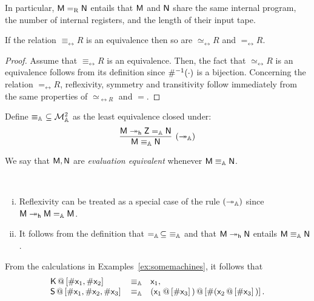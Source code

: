 In particular, $\mathsf M =_{\text{\sc R}} \mathsf N$ entails that $\mathsf M$ and $\mathsf N$ share the same internal program, the number of internal registers, and the length of their input tape.

\begin{lem}\label{lem:equivalence}
If the relation $\equiv_\rel{R}$ is an equivalence then so are $\simeq_\rel{R}$ and $=_\rel{R}$.
\end{lem}
\begin{proof} Assume that $\equiv_\rel{R}$ is an equivalence. Then, the fact that $\simeq_\rel{R}$ is an equivalence follows from its definition since $\#^{-1}(\cdot)$ is a bijection. Concerning the relation $=_\rel{R}$, reflexivity, symmetry and transitivity follow immediately from the same properties of $\simeq_{\rel{R}}$ and $=$.
\end{proof}

\begin{defi}\label{def:equiv:Addrs}
Define $\equiv_{\mathbb{A}}\ \subseteq\mathcal{M}_{\mathbb{A}}^2$ as the least equivalence closed under:
\[
	\infer[\redrule]{\mM\equiv_\Addrs	 \mN}{\mM\reddh \mZ =_\Addrs \mN}
\]
\end{defi}
We say that $\mathsf M,\mathsf N$ are \emph{evaluation equivalent} whenever $\mathsf M\equiv_{\mathbb{A}}\mathsf N$.

\begin{rem}\
\begin{enumerate}[(i)]
\item Reflexivity can be treated as a special case of the rule $(\twoheadrightarrow_{\mathbb{A}})$ since $\mathsf M\twoheadrightarrow_{\mathsf{h}}\mathsf M=_{\mathbb{A}} \mathsf M$.
\item It follows from the definition that $=_{\mathbb{A}}\,\subseteq\ \equiv_{\mathbb{A}}$ and that $\mathsf M\twoheadrightarrow_{\mathsf{h}} \mathsf N$ entails $\mathsf M\equiv_{\mathbb{A}} \mathsf N$.
\end{enumerate}
\end{rem}

\begin{exas}\label{ex:calculs}
From the calculations in Examples~\ref{ex:somemachines}, it follows that
\[
	\begin{array}{lcl}
	\mathsf K\,@\,{[}\#\mathsf{x}_1,\#\mathsf{x}_2{]}\,&\equiv_{\mathbb{A}}& \mathsf{x}_1, \\
	\mathsf S\,@\,{[}\#\mathsf{x}_1,\#\mathsf{x}_2,\#\mathsf{x}_3{]}\,&\equiv_{\mathbb{A}}& (\mathsf{x}_1\,@\,{[}\# \mathsf{x}_3{]}\,)\,@\,{[}\#(\mathsf{x}_2\,@\,{[}\# \mathsf{x}_3{]}\,){]}\,.\\
	\end{array}
\]
\end{exas}

